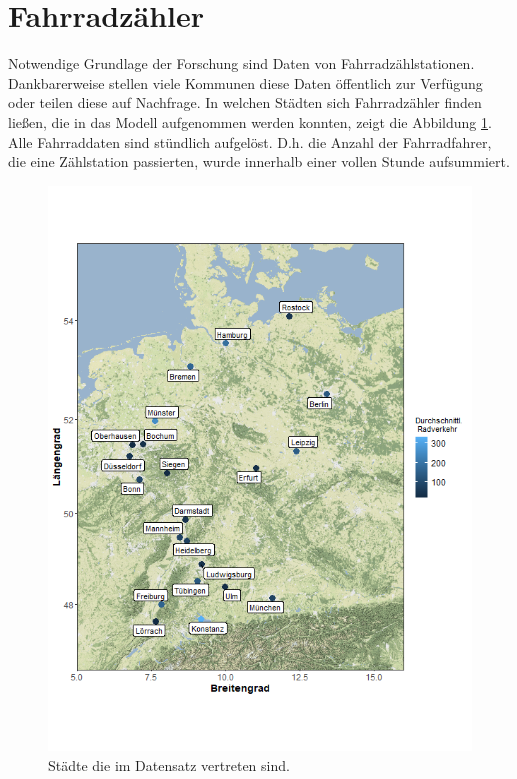 \documentclass[a4paper,12pt]{thesis}
\begin{document}
\section{Fahrradzähler}

Notwendige Grundlage der Forschung sind Daten von Fahrradzählstationen. Dankbarerweise stellen viele Kommunen diese Daten öffentlich zur Verfügung oder teilen diese auf Nachfrage. In welchen Städten sich Fahrradzähler finden ließen, die in das Modell aufgenommen werden konnten, zeigt die Abbildung \ref{Deutschlandkarte}. Alle Fahrraddaten sind stündlich aufgelöst. D.h. die Anzahl der Fahrradfahrer, die eine Zählstation passierten, wurde innerhalb einer vollen Stunde aufsummiert.
\begin{figure}[!ht]
	\centering
	\includegraphics[width=\textwidth]{Plots/plot22.png}
	\caption{Städte die im Datensatz vertreten sind.}
	\label{Deutschlandkarte}
\end{figure}
\end{document}
